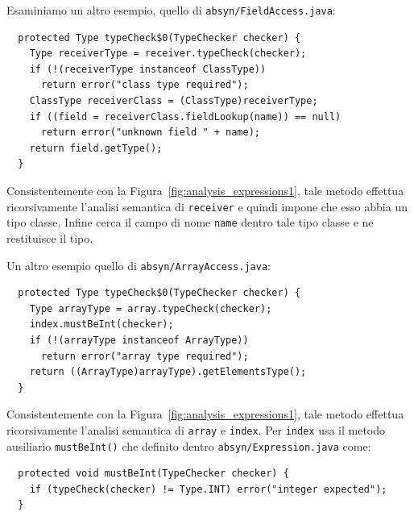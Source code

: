 Esaminiamo un altro esempio, quello di \texttt{absyn/FieldAccess.java}:
%
\begin{verbatim}
  protected Type typeCheck$0(TypeChecker checker) {
    Type receiverType = receiver.typeCheck(checker);
    if (!(receiverType instanceof ClassType))
      return error("class type required");
    ClassType receiverClass = (ClassType)receiverType;
    if ((field = receiverClass.fieldLookup(name)) == null)
      return error("unknown field " + name);
    return field.getType();
  }
\end{verbatim}
Consistentemente con la Figura~\ref{fig:analysis_expressions1},
tale metodo effettua ricorsivamente l'analisi semantica di
\texttt{receiver} e quindi impone che esso abbia un tipo classe.
Infine cerca il campo di nome \texttt{name} dentro tale tipo classe
e ne restituisce il tipo.

Un altro esempio \e quello di \texttt{absyn/ArrayAccess.java}:
%
\begin{verbatim}
  protected Type typeCheck$0(TypeChecker checker) {
    Type arrayType = array.typeCheck(checker);
    index.mustBeInt(checker);
    if (!(arrayType instanceof ArrayType))
      return error("array type required");
    return ((ArrayType)arrayType).getElementsType();
  }
\end{verbatim}
Consistentemente con la Figura~\ref{fig:analysis_expressions1},
tale metodo effettua ricorsivamente l'analisi semantica di
\texttt{array} e \texttt{index}. Per \texttt{index} usa il metodo ausiliario
\texttt{mustBeInt()} che \e definito dentro \texttt{absyn/Expression.java}
come:
%
\begin{verbatim}
  protected void mustBeInt(TypeChecker checker) {
    if (typeCheck(checker) != Type.INT) error("integer expected");
  }
\end{verbatim}

